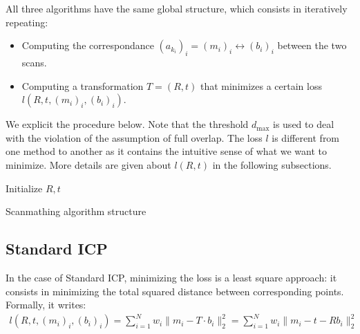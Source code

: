 \documentclass[11pt,letterpaper,leqno]{article}
\begin{document}
All three algorithms have the same global structure, which consists in iteratively repeating:
\begin{itemize}
    \item Computing the correspondance $(a_{k_i})_i = (m_i)_i \leftrightarrow (b_i)_i$ between the two scans.
    \item Computing a transformation $T = (R, t)$ that minimizes a certain loss $l(R,t, (m_i)_i, (b_i)_i)$.
\end{itemize}
We explicit the procedure below. Note that the threshold $d_{\text{max}}$ is used to deal with the violation of the assumption of full overlap. The loss $l$ is different from one method to another as it contains the intuitive sense of what we want to minimize. More details are given about $l(R,t)$ in the following subsections. \\

\begin{algorithm}[H]
    \SetAlgoLined
     Initialize $R,t$\;
    \caption{Scanmathing algorithm structure}
    \label{algo}
\end{algorithm}


\subsection{Standard ICP}

In the case of Standard ICP, minimizing the loss is a least square approach: it consists in minimizing the total squared distance between corresponding points. Formally, it writes:
\begin{align*}
    l(R,t, (m_i)_i, (b_i)_i) = \sum_{i=1}^N w_i \|m_i - T \cdot b_i\|_2^2 = \sum_{i=1}^N w_i \|m_i - t - R b_i\|_2^2
\end{align*}
\end{document}
